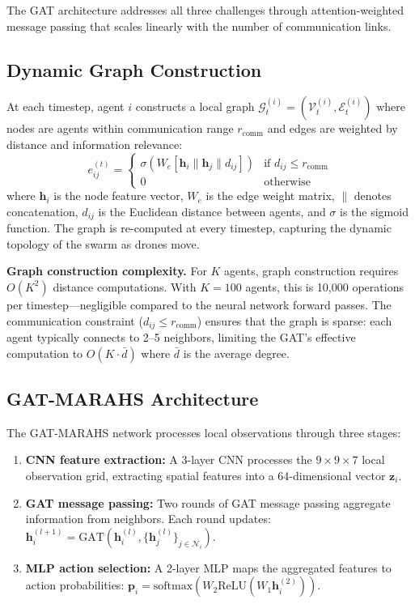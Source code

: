 \documentclass[12pt,a4paper]{article}
\DeclareRobustCommand{\cE}{\mathcal{E}}
\DeclareRobustCommand{\cG}{\mathcal{G}}
\DeclareRobustCommand{\cN}{\mathcal{N}}
\DeclareRobustCommand{\cV}{\mathcal{V}}
\DeclareRobustCommand{\vect}[1]{\bm{#1}}
\newcommand{\ReLU}{\mathrm{ReLU}}
\begin{document}
The GAT architecture addresses all three challenges through attention-weighted message passing that scales linearly with the number of communication links.

\subsection{Dynamic Graph Construction}
At each timestep, agent $i$ constructs a local graph $\cG_t^{(i)} = (\cV_t^{(i)}, \cE_t^{(i)})$ where nodes are agents within communication range $r_{\text{comm}}$ and edges are weighted by distance and information relevance:
\begin{equation}
    e_{ij}^{(t)} = \begin{cases}
    \sigma(W_e [\vect{h}_i \| \vect{h}_j \| d_{ij}]) & \text{if } d_{ij} \leq r_{\text{comm}} \\
    0 & \text{otherwise}
    \end{cases}
\end{equation}
where $\vect{h}_i$ is the node feature vector, $W_e$ is the edge weight matrix, $\|$ denotes concatenation, $d_{ij}$ is the Euclidean distance between agents, and $\sigma$ is the sigmoid function. The graph is re-computed at every timestep, capturing the dynamic topology of the swarm as drones move.

\textbf{Graph construction complexity.} For $K$ agents, graph construction requires $O(K^2)$ distance computations. With $K = 100$ agents, this is 10,000 operations per timestep---negligible compared to the neural network forward passes. The communication constraint ($d_{ij} \leq r_{\text{comm}}$) ensures that the graph is sparse: each agent typically connects to 2--5 neighbors, limiting the GAT's effective computation to $O(K \cdot \bar{d})$ where $\bar{d}$ is the average degree.

\subsection{GAT-MARAHS Architecture}
The GAT-MARAHS network processes local observations through three stages:

\begin{enumerate}[leftmargin=*]
    \item \textbf{CNN feature extraction:} A 3-layer CNN processes the $9 \times 9 \times 7$ local observation grid, extracting spatial features into a 64-dimensional vector $\vect{z}_i$.
    \item \textbf{GAT message passing:} Two rounds of GAT message passing aggregate information from neighbors. Each round updates: $\vect{h}_i^{(l+1)} = \text{GAT}(\vect{h}_i^{(l)}, \{\vect{h}_j^{(l)}\}_{j \in \cN_i})$.
    \item \textbf{MLP action selection:} A 2-layer MLP maps the aggregated features to action probabilities: $\vect{p}_i = \text{softmax}(W_2 \ReLU(W_1 \vect{h}_i^{(2)}))$.
\end{enumerate}
\end{document}
